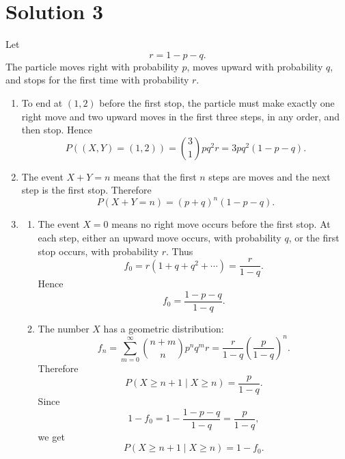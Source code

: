 \documentclass[10pt,a4paper]{article}
\begin{document}
\section*{Solution 3}

Let
\[
  r=1-p-q.
\]
The particle moves right with probability $p$, moves upward with probability $q$, and stops for the first time with probability $r$.

\begin{enumerate}
  \item To end at $(1,2)$ before the first stop, the particle must make exactly one right move and two upward moves in the first three steps, in any order, and then stop. Hence
        \[
          P((X,Y)=(1,2))
          =
          \binom31pq^2r
          =
          \boxed{3pq^2(1-p-q).}
        \]

  \item The event $X+Y=n$ means that the first $n$ steps are moves and the next step is the first stop. Therefore
        \[
          \boxed{
          P(X+Y=n)=(p+q)^n(1-p-q).}
        \]

  \item
        \begin{enumerate}
          \item The event $X=0$ means no right move occurs before the first stop. At each step, either an upward move occurs, with probability $q$, or the first stop occurs, with probability $r$. Thus
                \[
                  f_0=r(1+q+q^2+\cdots)
                  =
                  \frac{r}{1-q}.
                \]
                Hence
                \[
                  \boxed{
                  f_0=\frac{1-p-q}{1-q}.}
                \]

          \item The number $X$ has a geometric distribution:
                \[
                  f_n
                  =
                  \sum_{m=0}^\infty
                  \binom{n+m}{n}p^nq^mr
                  =
                  \frac{r}{1-q}
                  \left(\frac{p}{1-q}\right)^n.
                \]
                Therefore
                \[
                  P(X\geq n+1\mid X\geq n)
                  =
                  \frac{p}{1-q}.
                \]
                Since
                \[
                  1-f_0
                  =
                  1-\frac{1-p-q}{1-q}
                  =
                  \frac{p}{1-q},
                \]
                we get
                \[
                  \boxed{
                  P(X\geq n+1\mid X\geq n)=1-f_0.}
                \]


\end{enumerate}
\end{enumerate}
\end{document}
